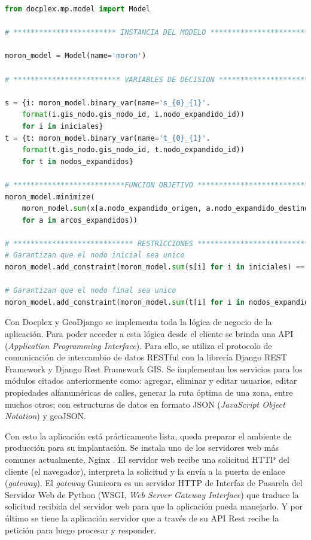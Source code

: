 \hfill
\begin{lstlisting}[language=Python,caption={Fragmento de código en Docplex},label={codigoDocplex}]
from docplex.mp.model import Model

# ************************ INSTANCIA DEL MODELO ******************************

moron_model = Model(name='moron')
    
# ************************* VARIABLES DE DECISION ****************************

s = {i: moron_model.binary_var(name='s_{0}_{1}'.
    format(i.gis_nodo.gis_nodo_id, i.nodo_expandido_id)) 
    for i in iniciales}
t = {t: moron_model.binary_var(name='t_{0}_{1}'.
    format(t.gis_nodo.gis_nodo_id, t.nodo_expandido_id)) 
    for t in nodos_expandidos}

# **************************FUNCION OBJETIVO *********************************
moron_model.minimize(
    moron_model.sum(x[a.nodo_expandido_origen, a.nodo_expandido_destino] * a.peso 
    for a in arcos_expandidos))
    
# **************************** RESTRICCIONES *********************************
# Garantizan que el nodo inicial sea unico
moron_model.add_constraint(moron_model.sum(s[i] for i in iniciales) == 1)

# Garantizan que el nodo final sea unico
moron_model.add_constraint(moron_model.sum(t[i] for i in nodos_expandidos) == 1))
\end{lstlisting}

Con Docplex y GeoDjango se implementa toda la lógica de negocio de la aplicación. Para poder acceder a esta lógica desde el cliente se brinda una API (\textit{Application Programming Interface}). Para ello, se utiliza el protocolo de comunicación de intercambio de datos RESTful con la librería Django REST Framework y Django Rest Framework GIS. Se implementan los servicios para los módulos citados anteriormente como: agregar, eliminar y editar usuarios, editar propiedades alfanuméricas de calles, generar la ruta óptima de una zona, entre muchos otros; con estructuras de datos en formato JSON (\textit{JavaScript Object Notation}) y geoJSON.

Con esto la aplicación está prácticamente lista, queda preparar el ambiente de producción para su implantación. Se instala uno de los servidores web más comunes actualmente, Nginx \citep{NGINX}. El servidor web recibe una solicitud HTTP del cliente (el navegador), interpreta la solicitud y la envía a la puerta de enlace (\textit{gateway}). El \textit{gateway} Gunicorn \citep{Gunicorn} es un servidor HTTP de Interfaz de Pasarela del Servidor Web de Python (WSGI, \textit{Web Server Gateway Interface}) que traduce la solicitud recibida del servidor web para que la aplicación pueda manejarlo. Y por último se tiene la aplicación servidor que a través de su API Rest recibe la petición para luego procesar y responder.

